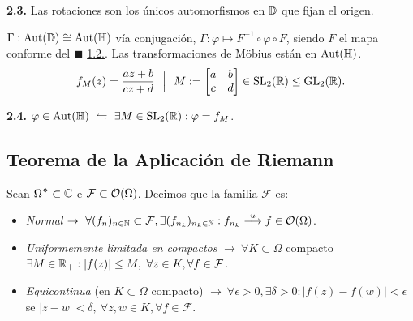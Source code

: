 \begin{corollary}
    \textbf{2.3.} Las rotaciones son los únicos automorfismos en \(\mathbb{D}\) que fijan el origen. %
\end{corollary}

\begin{note}
    \(\Gamma: \operatorname{Aut}(\mathbb{D}) \cong \operatorname{Aut}(\mathbb{H})\) vía conjugación, \(\Gamma : \varphi \mapsto F^{-1} \circ \varphi \circ F\), siendo \(F\) el mapa conforme del \(\blacksquare\) \hyperlink{thm812}{1.2.}. Las transformaciones de Möbius están en \(\operatorname{Aut}(\mathbb{H})\).%
    \[f_M(z) = \frac{az+ b}{cz+ d} \ \ \Big| \ \ M:= \begin{bmatrix}
    a & b \\ c & d   
    \end{bmatrix} \in \operatorname{SL}_2(\mathbb{R}) \leq \operatorname{GL}_2(\mathbb{R}).\]
\end{note}

\begin{theorem}
    \textbf{2.4.} \(\varphi \in \operatorname{Aut}(\mathbb{H}) \ \leftrightharpoons \ \exists M \in \operatorname{SL}_2(\mathbb{R})  : \varphi = f_M\). 
\end{theorem}

\subsection*{Teorema de la Aplicación de Riemann}

\begin{definition}
    Sean \(\Omega \ab \subset \C\) e \(\mathcal{F}\subset \mathcal{O}(\Omega) \). Decimos que la familia \(\mathcal{F}\) es: 
    \vspace{-0.2cm}
    \begin{itemize}[label = \(\star\), left = 1cm]
        \item \emph{Normal} \(\rightarrow  \ \forall (f_n)_{n\in \mathbb{N}} \subset \mathcal{F}, \exists (f_{n_k})_{n_k \in \mathbb{N}} : f_{n_k} \overset{u}{\longrightarrow} f \in \mathcal{O}(\Omega)\). 
        \item \emph{Uniformemente limitada en compactos} \(\rightarrow \ \forall K \subset \Omega\) compacto \(\exists M \in \mathbb{R}_+ : |f(z)| \leq M, \ \forall z \in K, \forall f \in \mathcal{F}\). 
        \item \emph{Equicontinua} (en \(K\subset \Omega \) compacto) \(\rightarrow \ \forall \epsilon> 0 , \exists \delta > 0 : |f(z) - f(w)|< \epsilon \) se \( |z-w| < \delta, \ \forall z,w \in K, \forall f \in \mathcal{F}\). 
    \end{itemize}
\end{definition}

